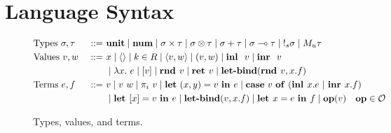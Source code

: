 \section{Language Syntax}

\begin{figure}[tbp]
  \begin{alignat*}{3}
         &\text{Types } \sigma, \tau &::=~ &\mathbf{unit}
         \mid \textbf{num}
         \mid \sigma \times \tau 
         \mid \sigma \otimes \tau
         \mid \sigma + \tau 
         \mid \sigma \multimap \tau
         \mid {{!_{s}} \sigma}
         \mid {M_u \tau}
         \\
         &\text{Values } v, w \ &::=~ &x
         \mid \langle \rangle
         \mid k \in R
         \mid \langle v,w \rangle 
         \mid  (v, w)
         \mid \textbf{inl } \ v
         \mid \textbf{inr } \ v
         \\
         & & & \mid \lambda x.~e 
         \mid [v]
         \mid\textbf{rnd } v
         \mid {\textbf{ret }v} 
         \mid \textbf{let-bind}(\textbf{rnd } v,x.f) \\
         &\text{Terms } e, f &::=~ & v
	\mid v~w
         \mid {\pi}_i\ v
         \mid \mathbf{let} \ (x,y) = v \ \textbf{in } e
         \mid \mathbf{case} \ v \ \mathbf{of} \ (\textbf{inl } x.e \ | \ \textbf{inr } x.f) 
         \\
         & & & \mid
          \textbf{let } [x]  = v \ \textbf{in }  e
         \mid {\textbf{let-bind}(v,x.f)} 
         \mid \textbf{let } x  = e \ \textbf{in }  f 
         \mid \mathbf{op}(v) \quad \mathbf{op} \in \mathcal{O}
  \end{alignat*}
  \caption{Types, values, and terms.}
  \label{fig:syntax}
\end{figure}


